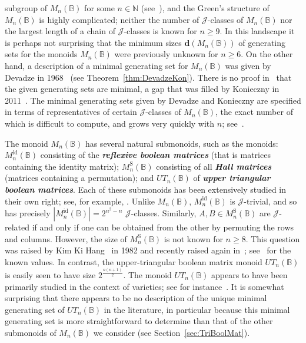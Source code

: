 \documentclass[11pt]{article}
\newcommand{\defn}[1]{\textbf{\textit{#1}}}
\numberwithin{equation}{section}
\newcommand{\B}{\mathbb{B}}
\newcommand{\Bn}{M_n(\B)}
\newcommand{\Refln}{M_n^{\text{id}}(\B)}
\newcommand{\Halln}{M_n^{\text{S}}(\B)}
\newcommand{\UTn}{UT_n(\B)}
\newcommand{\J}{\mathscr{J}}
\newcommand{\N}{\mathbb{N}}
\begin{document}
subgroup of $\Bn$ for some $n \in \N$ (see~\cite{Clifford1970aa, Montague1969aa,
  Plemmons1970ab}), and the Green's structure of $\Bn$ is highly complicated;
neither the number of $\J$-classes of $\Bn$ nor the largest length of a chain of
$\J$-classes is known for $n\geq 9$. In this landscape it is perhaps not
surprising that the minimum sizes $\mathbf{d}(\Bn)$ of generating sets for the
monoids $\Bn$ were previously unknown for $n \geq 6$. On the other hand, a
description of a minimal generating set for $\Bn$ was given by  Devadze in
1968~\cite{Devadze1968aa} (see Theorem~\ref{thm:DevadzeKon}). There is no proof
in~\cite{Devadze1968aa} that the given generating sets are minimal, a gap that
was filled by Konieczny in 2011~\cite{Konieczny2011aa}. The minimal generating
sets given by Devadze and Konieczny are specified in terms of representatives of
certain $\J$-classes of $\Bn$, the exact number of which is difficult to
compute, and grows very quickly with $n$; see~.

The monoid $\Bn$ has several natural submonoids, such as the
monoids: $\Refln$ consisting of the \defn{reflexive boolean
  matrices} (that is matrices containing the identity matrix); $\Halln$
consisting of all \defn{Hall matrices} (matrices containing a permutation); and
$\UTn$ of \defn{upper triangular boolean matrices}. Each of these submonoids has
been extensively studied in their own right; see, for example,
\cite{Butler1974aa, Cho1993ab, Gaysin2020aa, Kim1977aa, Li2011aa, Pin1985aa,
  Schwarz1973aa, Straubing1980aa, Tan2000aa, Zhang2020aa}. Unlike $\Bn$,
$\Refln$ is $\J$-trivial, and so has precisely $|\Refln| = 2 ^ {n ^ 2 - n}$
$\J$-classes. Similarly, $A, B\in \Halln$ are $\J$-related if and only if one
can be obtained from the other by permuting the rows and columns. However, the
size of $\Halln$ is not known for $n\geq 8$. This question was raised by Kim Ki
Hang~\cite[Problem 13]{Kim1982aa} in 1982 and recently raised again
in~\cite{Gaysin2020aa}; see~\cite{OEISHall} for the known values. In contrast,
the upper-triangular boolean matrix monoid $\UTn$ is easily seen to have size
$2^{\frac{n(n+1)}{2}}$.
The monoid $\UTn$ appears to have been primarily studied in the context of
varieties; see for instance~\cite{Li2011aa, Zhang2020aa}. It is somewhat
surprising that there appears to be no description of the unique minimal
generating set of $\UTn$ in the literature, in particular because this minimal
generating set is more straightforward to determine than that of the other
submonoids of $\Bn$ we consider (see Section~\ref{sec:TriBoolMat}).
\end{document}
